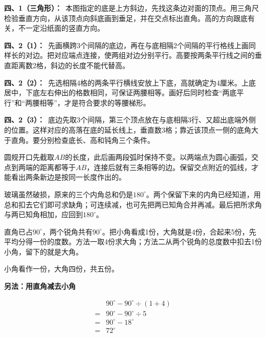 \documentclass[multi=snippet,border=0pt]{standalone}
\newenvironment{snippet}[3]{\begin{minipage}{#1bp}\color{answerred}\fontsize{#2}{#3}\selectfont\raggedright}{\end{minipage}}
\begin{document}
\begin{snippet}{505}{11.5}{14}\textbf{四、1（三角形）：}\ 本图指定的底是上方斜边，先找这条边对面的顶点。用三角尺检验垂直方向，从该顶点向斜底画到垂足，并在交点标出直角。高的方向跟底有关，不一定沿纸面的竖直方向。\end{snippet}
\begin{snippet}{505}{11.5}{14}\textbf{四、2（1）：}\ 先画横跨3个间隔的底边，再在与底相隔2个间隔的平行格线上画同样长的对边。把对应端点连接，使两组对边分别平行。高要按两条平行线之间的垂直距离数2格，斜边的长度不能代替高。\end{snippet}
\begin{snippet}{505}{11.5}{14}\textbf{四、2（2）：}\ 先选相隔4格的两条平行横线安放上下底，高就确定为4厘米。上底居中，下底左右伸出的格数相同，可保证两腰相等。画好后同时检查“两底平行”和“两腰相等”，才是符合要求的等腰梯形。\end{snippet}
\begin{snippet}{505}{11.5}{14}\textbf{四、2（3）：}\ 底边先取3个间隔，第三个顶点放在与底相隔3行、又超出底端外侧的位置。这样对应的高落在底的延长线上，垂直数3格；靠近该顶点一侧的底角大于直角。要分别检查底长、高和钝角三个条件。\end{snippet}
\begin{snippet}{505}{11.5}{14}圆规开口先截取\(AB\)的长度，此后画两段弧时保持不变。以两端点为圆心画弧，交点到两端的距离都等于\(AB\)，连接后就有三条相等的边。保留交点附近的弧线，才能看出两条新边是按同一长度作出的。\end{snippet}
\begin{snippet}{505}{11.5}{14}玻璃虽然破损，原来的三个内角总和仍是\(180^\circ\)。两个保留下来的内角已经知道，用总和扣去它们即可求缺角；可连续减，也可先把两已知角合并再减。最后把所求角与两已知角相加，应回到\(180^\circ\)。\end{snippet}
\begin{snippet}{505}{11.5}{14}直角已占\(90^\circ\)，两个锐角共有\(90^\circ\)。把小角看成1份，大角就是4份，合起来5份，先平均分得一份的度数。方法一取4份求大角；方法二从两个锐角的总度数中扣去1份小角，留下的就是大角。\par 小角看作一份，大角四份，共五份。\par \textbf{另法：用直角减去小角}\par \[\begin{aligned}&90^\circ-90^\circ\div(1+4)\\={}&90^\circ-90^\circ\div5\\={}&90^\circ-18^\circ\\={}&72^\circ\end{aligned}\]\end{snippet}
\end{document}
